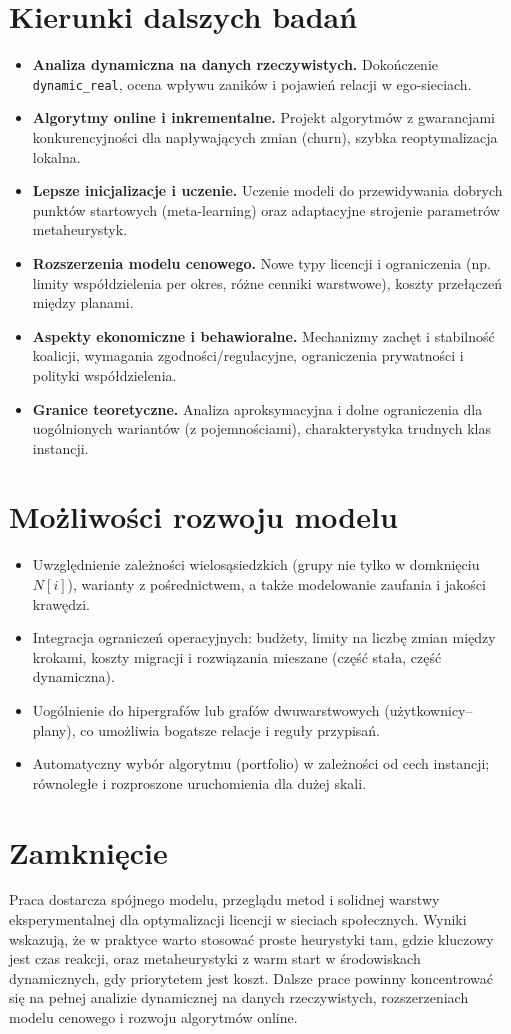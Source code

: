\section{Kierunki dalszych badań}
\begin{itemize}
  \item \textbf{Analiza dynamiczna na danych rzeczywistych.} Dokończenie \texttt{dynamic\_real}, ocena wpływu zaników i pojawień relacji w ego-sieciach.
  \item \textbf{Algorytmy online i inkrementalne.} Projekt algorytmów z gwarancjami konkurencyjności dla napływających zmian (churn), szybka reoptymalizacja lokalna.
  \item \textbf{Lepsze inicjalizacje i uczenie.} Uczenie modeli do przewidywania dobrych punktów startowych (meta-learning) oraz adaptacyjne strojenie parametrów metaheurystyk.
  \item \textbf{Rozszerzenia modelu cenowego.} Nowe typy licencji i ograniczenia (np. limity współdzielenia per okres, różne cenniki warstwowe), koszty przełączeń między planami.
  \item \textbf{Aspekty ekonomiczne i behawioralne.} Mechanizmy zachęt i stabilność koalicji, wymagania zgodności/regulacyjne, ograniczenia prywatności i polityki współdzielenia.
  \item \textbf{Granice teoretyczne.} Analiza aproksymacyjna i dolne ograniczenia dla uogólnionych wariantów (z pojemnościami), charakterystyka trudnych klas instancji.
\end{itemize}

\section{Możliwości rozwoju modelu}
\begin{itemize}
  \item Uwzględnienie zależności wielosąsiedzkich (grupy nie tylko w domknięciu $N[i]$), warianty z pośrednictwem, a także modelowanie zaufania i jakości krawędzi.
  \item Integracja ograniczeń operacyjnych: budżety, limity na liczbę zmian między krokami, koszty migracji i rozwiązania mieszane (część stała, część dynamiczna).
  \item Uogólnienie do hipergrafów lub grafów dwuwarstwowych (użytkownicy–plany), co umożliwia bogatsze relacje i reguły przypisań.
  \item Automatyczny wybór algorytmu (portfolio) w zależności od cech instancji; równoległe i rozproszone uruchomienia dla dużej skali.
\end{itemize}

\section{Zamknięcie}
Praca dostarcza spójnego modelu, przeglądu metod i solidnej warstwy eksperymentalnej dla optymalizacji licencji w sieciach społecznych. Wyniki wskazują, że w praktyce warto stosować proste heurystyki tam, gdzie kluczowy jest czas reakcji, oraz metaheurystyki z warm start w środowiskach dynamicznych, gdy priorytetem jest koszt. Dalsze prace powinny koncentrować się na pełnej analizie dynamicznej na danych rzeczywistych, rozszerzeniach modelu cenowego i rozwoju algorytmów online.

